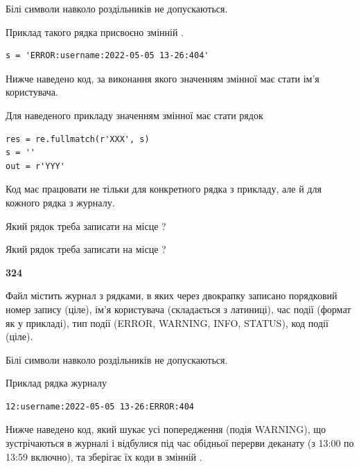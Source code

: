 Білі символи навколо роздільників не допускаються.

Приклад такого рядка присвоєно змінній .



\begin{verbatim}
s = 'ERROR:username:2022-05-05 13-26:404'
\end{verbatim}


Нижче наведено код, за виконання якого значенням змінної  має стати ім'я користувача.

Для наведеного прикладу значенням змінної  має стати рядок 



\begin{verbatim}
res = re.fullmatch(r'XXX', s)
s = ''
out = r'YYY'
\end{verbatim}


Код має працювати не тільки для конкретного рядка з прикладу, але й для кожного рядка з журналу.




Який рядок треба записати на місце  ?\par
\vspace{5mm}


Який рядок треба записати на місце  ?\par


\newpage

{\begin {center}\textbf{ 324}\end {center}}\par
Файл  містить журнал з рядками, в яких через двокрапку записано поряд\-ко\-вий номер запису (ціле), ім'я користувача (складається з латиниці), час події (фор\-мат як у прикладі), тип події (ERROR, WARNING, INFO, STATUS), код події (ціле).

Білі символи навколо роздільників не допускаються.

Приклад рядка журналу



\begin{verbatim}
12:username:2022-05-05 13-26:ERROR:404
\end{verbatim}


Нижче наведено код, який шукає усі попередження (подія WARNING), що зустрі\-ча\-ються в журналі і відбулися під час обідньої перерви деканату (з 13:00 по 13:59 включно), та зберігає їх коди в змінній .



